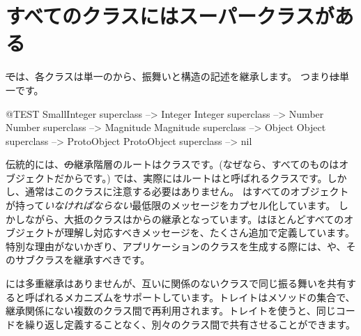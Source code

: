 \documentclass[a4paper,10pt,twoside]{book}
\begin{document}
\section{すべてのクラスにはスーパークラスがある}


\st では、各クラスは単一のから、振舞いと構造の記述を継承します。
つまり\st は単一です。

\begin{code}{@TEST}
SmallInteger superclass --> Integer
Integer superclass          --> Number
Number superclass        --> Magnitude
Magnitude superclass    --> Object
Object superclass           --> ProtoObject
ProtoObject superclass  --> nil
\end{code}

伝統的には、\st の継承階層のルートはクラスです。(なぜなら、すべてのものはオブジェクトだからです。)
\pharo では、実際にはルートはと呼ばれるクラスです。しかし、通常はこのクラスに注意する必要はありません。
はすべてのオブジェクトが持って\emph{いなければならない}最低限のメッセージをカプセル化しています。
しかしながら、大抵のクラスはからの継承となっています。はほとんどすべてのオブジェクトが理解し対応すべきメッセージを、たくさん追加で定義しています。特別な理由がないかぎり、アプリケーションのクラスを生成する際には、や、そのサブクラスを継承すべきです。



\pharo には多重継承はありませんが、互いに関係のないクラスで同じ振る舞いを共有すると呼ばれるメカニズムをサポートしています。トレイトはメソッドの集合で、継承関係にない複数のクラス間で再利用されます。トレイトを使うと、同じコードを繰り返し定義することなく、別々のクラス間で共有させることができます。
\end{document}
